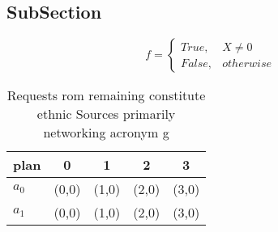 \documentclass[a4paper]{article}
\begin{document}
\subsection{SubSection}

\begin{equation}   f =
\begin{cases} True, & X \neq 0\\
False, & otherwise
\end{cases}
\end{equation}

\begin{table}
\begin{adjustbox}{width=0.5\columnwidth}
\begin{tabular}{|l|l|l|l|l|}
\hline
\textbf{plan} & \multicolumn{1}{c|}{\textbf{0}} & \multicolumn{1}{c|}{\textbf{1}} & \multicolumn{1}{c|}{\textbf{2}} & \multicolumn{1}{c|}{\textbf{3}} \\ \hline
\textbf{$a_0$}  & (0,0) & (1,0) & (2,0) & (3,0) \\ \hline
\textbf{$a_1$}  & (0,0) & (1,0) & (2,0) & (3,0) \\ \hline
\end{tabular}
\end{adjustbox}
\caption{Requests rom remaining constitute ethnic Sources primarily networking acronym g
}
\end{table}
\end{document}
